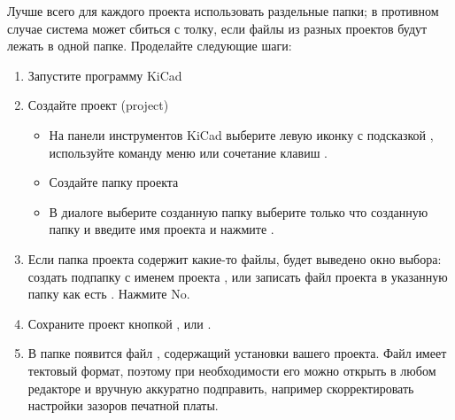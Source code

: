 
\bigskip
Лучше всего для каждого проекта использовать раздельные папки; в противном
случае система может сбиться с толку, если файлы из разных проектов будут лежать
в одной папке. Проделайте следующие шаги:

\begin{enumerate}
  \item Запустите программу KiCad
  \item Создайте проект (project)
  \begin{itemize}
    \item
На панели инструментов KiCad выберите левую иконку с подсказкой
, используйте команду меню
 или сочетание клавиш .
  \item Создайте папку проекта 
    \item
В диалоге  выберите созданную папку
выберите только что созданную папку  и
введите имя проекта  и нажмите .
  \end{itemize}
	\item
Если папка проекта содержит какие-то файлы, будет выведено окно выбора:
создать подпапку с именем проекта , или записать файл проекта
в указанную папку как есть . Нажмите No.
    \item
Сохраните проект кнопкой ,  или .
	\item
В папке появится файл , содержащий установки вашего
проекта. Файл имеет тектовый формат, поэтому при необходимости его можно открыть
в любом редакторе и вручную аккуратно подправить, например скорректировать
настройки зазоров печатной платы.
\end{enumerate}
